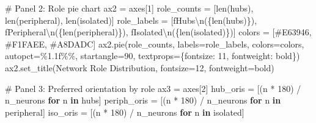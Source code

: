 \documentclass[
  11pt,
  letterpaper,
  oneside,
  openany]{book}
\newenvironment{Shaded}{\begin{snugshade}}{\end{snugshade}}
\newcommand{\BuiltInTok}[1]{\textcolor[rgb]{0.00,0.23,0.31}{#1}}
\newcommand{\CharTok}[1]{\textcolor[rgb]{0.13,0.47,0.30}{#1}}
\newcommand{\CommentTok}[1]{\textcolor[rgb]{0.37,0.37,0.37}{#1}}
\newcommand{\ControlFlowTok}[1]{\textcolor[rgb]{0.00,0.23,0.31}{\textbf{#1}}}
\newcommand{\DecValTok}[1]{\textcolor[rgb]{0.68,0.00,0.00}{#1}}
\newcommand{\KeywordTok}[1]{\textcolor[rgb]{0.00,0.23,0.31}{\textbf{#1}}}
\newcommand{\NormalTok}[1]{\textcolor[rgb]{0.00,0.23,0.31}{#1}}
\newcommand{\OperatorTok}[1]{\textcolor[rgb]{0.37,0.37,0.37}{#1}}
\newcommand{\SpecialCharTok}[1]{\textcolor[rgb]{0.37,0.37,0.37}{#1}}
\newcommand{\SpecialStringTok}[1]{\textcolor[rgb]{0.13,0.47,0.30}{#1}}
\newcommand{\StringTok}[1]{\textcolor[rgb]{0.13,0.47,0.30}{#1}}
\begin{document}
\begin{Shaded}
\begin{Highlighting}[]
\CommentTok{\# Panel 2: Role pie chart}
\NormalTok{ax2 }\OperatorTok{=}\NormalTok{ axes[}\DecValTok{1}\NormalTok{]}
\NormalTok{role\_counts }\OperatorTok{=}\NormalTok{ [}\BuiltInTok{len}\NormalTok{(hubs), }\BuiltInTok{len}\NormalTok{(peripheral), }\BuiltInTok{len}\NormalTok{(isolated)]}
\NormalTok{role\_labels }\OperatorTok{=}\NormalTok{ [}\SpecialStringTok{f\textquotesingle{}Hubs}\CharTok{\textbackslash{}n}\SpecialStringTok{(}\SpecialCharTok{\{}\BuiltInTok{len}\NormalTok{(hubs)}\SpecialCharTok{\}}\SpecialStringTok{)\textquotesingle{}}\NormalTok{, }\SpecialStringTok{f\textquotesingle{}Peripheral}\CharTok{\textbackslash{}n}\SpecialStringTok{(}\SpecialCharTok{\{}\BuiltInTok{len}\NormalTok{(peripheral)}\SpecialCharTok{\}}\SpecialStringTok{)\textquotesingle{}}\NormalTok{, }
              \SpecialStringTok{f\textquotesingle{}Isolated}\CharTok{\textbackslash{}n}\SpecialStringTok{(}\SpecialCharTok{\{}\BuiltInTok{len}\NormalTok{(isolated)}\SpecialCharTok{\}}\SpecialStringTok{)\textquotesingle{}}\NormalTok{]}
\NormalTok{colors }\OperatorTok{=}\NormalTok{ [}\StringTok{\textquotesingle{}\#E63946\textquotesingle{}}\NormalTok{, }\StringTok{\textquotesingle{}\#F1FAEE\textquotesingle{}}\NormalTok{, }\StringTok{\textquotesingle{}\#A8DADC\textquotesingle{}}\NormalTok{]}
\NormalTok{ax2.pie(role\_counts, labels}\OperatorTok{=}\NormalTok{role\_labels, colors}\OperatorTok{=}\NormalTok{colors, autopct}\OperatorTok{=}\StringTok{\textquotesingle{}}\SpecialCharTok{\%1.1f\%\%}\StringTok{\textquotesingle{}}\NormalTok{,}
\NormalTok{       startangle}\OperatorTok{=}\DecValTok{90}\NormalTok{, textprops}\OperatorTok{=}\NormalTok{\{}\StringTok{\textquotesingle{}fontsize\textquotesingle{}}\NormalTok{: }\DecValTok{11}\NormalTok{, }\StringTok{\textquotesingle{}fontweight\textquotesingle{}}\NormalTok{: }\StringTok{\textquotesingle{}bold\textquotesingle{}}\NormalTok{\})}
\NormalTok{ax2.set\_title(}\StringTok{\textquotesingle{}Network Role Distribution\textquotesingle{}}\NormalTok{, fontsize}\OperatorTok{=}\DecValTok{12}\NormalTok{, fontweight}\OperatorTok{=}\StringTok{\textquotesingle{}bold\textquotesingle{}}\NormalTok{)}

\CommentTok{\# Panel 3: Preferred orientation by role}
\NormalTok{ax3 }\OperatorTok{=}\NormalTok{ axes[}\DecValTok{2}\NormalTok{]}
\NormalTok{hub\_oris }\OperatorTok{=}\NormalTok{ [(n }\OperatorTok{*} \DecValTok{180}\NormalTok{) }\OperatorTok{/}\NormalTok{ n\_neurons }\ControlFlowTok{for}\NormalTok{ n }\KeywordTok{in}\NormalTok{ hubs]}
\NormalTok{periph\_oris }\OperatorTok{=}\NormalTok{ [(n }\OperatorTok{*} \DecValTok{180}\NormalTok{) }\OperatorTok{/}\NormalTok{ n\_neurons }\ControlFlowTok{for}\NormalTok{ n }\KeywordTok{in}\NormalTok{ peripheral]}
\NormalTok{iso\_oris }\OperatorTok{=}\NormalTok{ [(n }\OperatorTok{*} \DecValTok{180}\NormalTok{) }\OperatorTok{/}\NormalTok{ n\_neurons }\ControlFlowTok{for}\NormalTok{ n }\KeywordTok{in}\NormalTok{ isolated]}


\end{Highlighting}
\end{Shaded}
\end{document}
